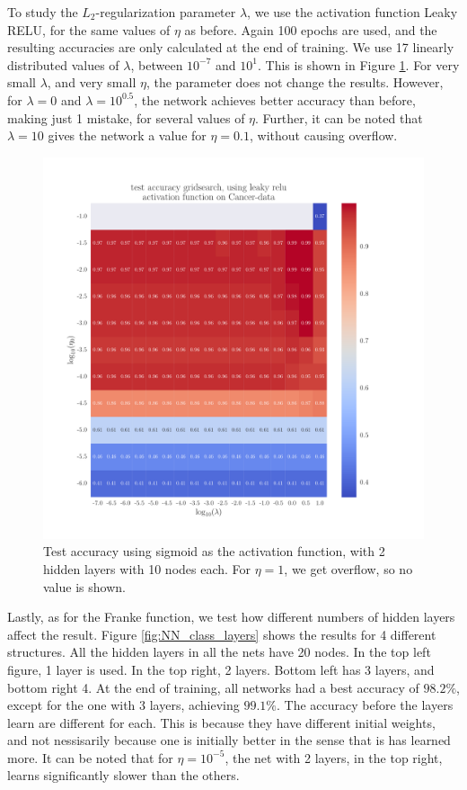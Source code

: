 \documentclass[12pt]{extarticle}
\begin{document}
To study the $L_2$-regularization parameter $\lambda$, we use the activation function Leaky RELU, for the same values of $\eta$ as before. Again 100 epochs are used, and the resulting accuracies are only calculated at the end of training. We use 17 linearly  distributed values of $\lambda$, between $10^{-7}$ and $10^1$. This is shown in Figure \ref{fig:NN_Cancer_eta_lambda}. For very small $\lambda$, and very small $\eta$, the parameter does not change the results. However, for $\lambda=0$ and $\lambda=10^{0.5}$, the network achieves better accuracy than before, making just 1 mistake, for several values of $\eta$. Further, it can be noted that $\lambda=10$ gives the network a value for $\eta=0.1$, without causing overflow.

\begin{figure}[h]
	\includegraphics[width=\linewidth]{plots/NN_Cancer__dynamic_eta_lambda__test_accuracy__leaky_relu__888173.pdf}
	\caption{Test accuracy using sigmoid as the activation function, with 2 hidden layers with 10 nodes each. For $\eta=1$, we get overflow, so no value is shown. }\label{fig:NN_Cancer_eta_lambda}
\end{figure}

Lastly, as for the Franke function, we test how different numbers of hidden layers affect the result. Figure \ref{fig:NN_class_layers} shows the results for 4 different structures. All the hidden layers in all the nets have 20 nodes. In the top left figure, 1 layer is used. In the top right, 2 layers. Bottom left has 3 layers, and bottom right 4. At the end of training, all networks had a best accuracy of $98.2\%$, except for the one with 3 layers, achieving $99.1\%$. The accuracy before the layers learn are different for each. This is because they have different initial weights, and not nessisarily because one is initially better in the sense that is has learned more. It can be noted that for $\eta=10^{-5}$, the net with 2 layers, in the top right, learns significantly slower than the others.
\end{document}
